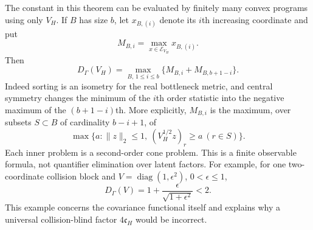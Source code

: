 The constant in this theorem can be evaluated by finitely many convex
programs using only $V_H$. If $B$ has size $b$, let $x_{B,(i)}$ denote
its $i$th increasing coordinate and put
\[
 M_{B,i}=\max_{x\in\mathcal E_{V_H}}x_{B,(i)}.
\]
Then
\begin{equation}\label{eq:finite-quotient-constant}
 D_\Gamma(V_H)=\max_{B,\,1\le i\le b}
                     \{M_{B,i}+M_{B,b+1-i}\}.
\end{equation}
Indeed sorting is an isometry for the real bottleneck metric, and
central symmetry changes the minimum of the $i$th order statistic
into the negative maximum of the $(b+1-i)$th. More explicitly,
$M_{B,i}$ is the maximum, over subsets $S\subset B$ of cardinality
$b-i+1$, of
\[
 \max\{a:\|z\|_2\le1,\ (V_H^{1/2}z)_r\ge a\ (r\in S)\}.
\]
Each inner problem is a second-order cone problem. This is a finite
observable formula, not quantifier elimination over latent factors.
For example, for one two-coordinate collision block and
$V=\operatorname{diag}(1,\epsilon^2)$, $0<\epsilon\le1$,
\[
 D_\Gamma(V)=1+\frac{\epsilon}{\sqrt{1+\epsilon^2}}<2.
\]
This example concerns the covariance functional itself and explains
why a universal collision-blind factor $4\mathfrak c_H$ would be
incorrect.


